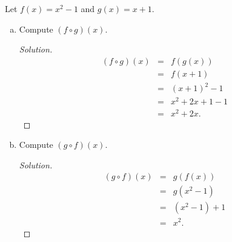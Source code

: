 \documentclass[12pt]{amsart}
\begin{document}
\begin{thm}[20 Points]\label{ex3}
  Let $f(x) = x^2 - 1$ and $g(x) = x + 1$.
  \begin{enumerate}[(a)]
  \item
    Compute $(f \circ g)(x)$.
    \begin{proof}[Solution]
      \begin{eqnarray*}
        (f \circ g)(x) &=& f\left(g(x)\right)\\
        &=& f\left(x + 1\right)\\
        &=& (x + 1)^2 - 1\\
        &=& x^2 + 2x + 1 - 1\\
        &=& x^2 + 2x.
      \end{eqnarray*}
    \end{proof}
  \item
    Compute $(g \circ f)(x)$.
    \begin{proof}[Solution]
      \begin{eqnarray*}
        (g \circ f)(x) &=& g\left(f(x)\right)\\
        &=& g\left(x^2 - 1\right)\\
        &=& \left(x^2 - 1\right) + 1\\
        &=& x^2.
      \end{eqnarray*}
    \end{proof}
  \end{enumerate}
\end{thm}
\end{document}
